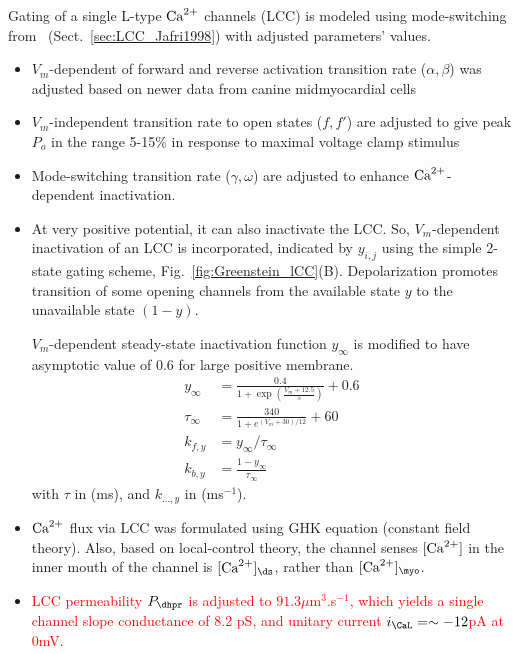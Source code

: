 Gating of a single L-type ${\text{Ca}^{2+}}$ channels (LCC) is modeled using mode-switching
from~\citep{jafri1998cad} (Sect.~\ref{sec:LCC_Jafri1998}) with adjusted
parameters' values.
\begin{itemize}
\item $V_m$-dependent of forward and reverse activation transition
  rate ($\alpha, \beta$) was adjusted based on newer data from canine
  midmyocardial cells \citep{hobai2001}

\item $V_m$-independent transition rate to open states ($f,f'$) are
  adjusted to give peak $P_o$ in the range 5-15\% in response to
  maximal voltage clamp stimulus
  
\item Mode-switching transition rate ($\gamma, \omega$) are adjusted
  to enhance ${\text{Ca}^{2+}}$-dependent inactivation.  
  
\item At very positive potential, it can also inactivate the LCC. So,
$V_m$-dependent inactivation of an LCC is incorporated, indicated by $y_{i,j}$
using the simple 2-state gating scheme,  Fig.~\ref{fig:Greenstein_lCC}(B).
Depolarization promotes transition  of some opening channels from the available
state $y$ to the unavailable state  $(1-y)$.

  $V_m$-dependent steady-state inactivation function $y_\infty$ is modified to
  have asymptotic value of 0.6 for large positive membrane.
  \begin{equation}
    \label{eq:1329}
    \begin{split}
        y_\infty &= \frac{0.4}{1+\exp(\frac{V_m+12.5}{5})}+0.6  \\
        \tau_\infty &= \frac{340}{1+e^{(V_m+30)/12}} + 60 \\
        k_{f,y} &= y_\infty/\tau_\infty \\
        k_{b,y} &= \frac{1-y_\infty}{\tau_\infty}
    \end{split}
  \end{equation}
  with $\tau$ in (ms), and $k_{\ldots,y}$ in (ms$^{-1}$).
 
\item ${\text{Ca}^{2+}}$ flux via LCC was formulated using GHK equation (constant field
theory). Also, based on local-control theory, the channel senses $[{\text{Ca}^{2+}}]$ in
the inner mouth of the channel is $[\Ca]_\ds$, rather than $[\Ca]_\myo$.
 
\item \textcolor{red}{LCC permeability $P_\dhpr$ is adjusted to
  $91.3\mu$m$^3$.s$^{-1}$, which yields a single channel slope
  conductance of 8.2 pS, and unitary current $i_\CaL = \sim -12$pA at 0mV}.
\end{itemize}

